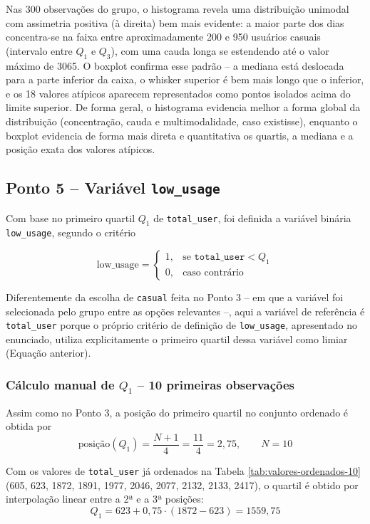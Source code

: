 \documentclass[10pt, a4paper]{article}
\begin{document}
Nas 300 observações do grupo, o histograma revela uma distribuição unimodal com assimetria positiva (à direita) bem mais evidente: a maior parte dos dias concentra-se na faixa entre aproximadamente 200 e 950 usuários casuais (intervalo entre $Q_1$ e $Q_3$), com uma cauda longa se estendendo até o valor máximo de 3065. O boxplot confirma esse padrão -- a mediana está deslocada para a parte inferior da caixa, o whisker superior é bem mais longo que o inferior, e os 18 valores atípicos aparecem representados como pontos isolados acima do limite superior. De forma geral, o histograma evidencia melhor a forma global da distribuição (concentração, cauda e multimodalidade, caso existisse), enquanto o boxplot evidencia de forma mais direta e quantitativa os quartis, a mediana e a posição exata dos valores atípicos.

\subsection{Ponto 5 -- Variável \texttt{low\_usage}}

Com base no primeiro quartil $Q_1$ de \texttt{total\_user}, foi definida a variável binária \texttt{low\_usage}, segundo o critério

\[
\text{low\_usage} =
\begin{cases}
1, & \text{se } \texttt{total\_user} < Q_1 \\
0, & \text{caso contrário}
\end{cases}
\]

Diferentemente da escolha de \texttt{casual} feita no Ponto 3 -- em que a variável foi selecionada pelo grupo entre as opções relevantes --, aqui a variável de referência é \texttt{total\_user} porque o próprio critério de definição de \texttt{low\_usage}, apresentado no enunciado, utiliza explicitamente o primeiro quartil dessa variável como limiar (Equação anterior).

\subsubsection{Cálculo manual de $Q_1$ -- 10 primeiras observações}

Assim como no Ponto 3, a posição do primeiro quartil no conjunto ordenado é obtida por
\[
\text{posição}(Q_1) = \frac{N+1}{4} = \frac{11}{4} = 2{,}75, \qquad N = 10
\]

Com os valores de \texttt{total\_user} já ordenados na Tabela \ref{tab:valores-ordenados-10} (605, 623, 1872, 1891, 1977, 2046, 2077, 2132, 2133, 2417), o quartil é obtido por interpolação linear entre a 2ª e a 3ª posições:
\[
Q_1 = 623 + 0{,}75 \cdot (1872 - 623) = 1559{,}75
\]
\end{document}
